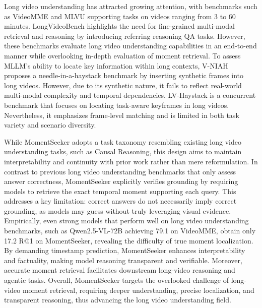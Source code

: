 \documentclass{article}
\begin{document}
Long video understanding has attracted growing attention, with benchmarks such as VideoMME \cite{fu2024videomme} and MLVU \cite{zhou2025mlvu} supporting tasks on videos ranging from 3 to 60 minutes. LongVideoBench \cite{wu2024longvideobench} highlights the need for fine-grained multi-modal retrieval and reasoning by introducing referring reasoning QA tasks. However, these benchmarks evaluate long video understanding capabilities in an end-to-end manner while overlooking in-depth evaluation of moment retrieval. 
To assess MLLM's ability to locate key information within long contexts, V-NIAH~\cite{zhang2024long} proposes a needle-in-a-haystack benchmark by inserting synthetic frames into long videos. However, due to its synthetic nature, it fails to reflect real-world multi-modal complexity and temporal dependencies. LV-Haystack \cite{ye2025lvhaystack} is a concurrent benchmark that focuses on locating task-aware keyframes in long videos. Nevertheless, it emphasizes frame-level matching and is limited in both task variety and scenario diversity.



While MomentSeeker adopts a task taxonomy resembling existing long video understanding tasks, such as Causal Reasoning, this design aims to maintain interpretability and continuity with prior work rather than mere reformulation. In contrast to previous long video understanding benchmarks that only assess answer correctness, MomentSeeker explicitly verifies grounding by requiring models to retrieve the exact temporal moment supporting each query. This addresses a key limitation: correct answers do not necessarily imply correct grounding, as models may guess without truly leveraging visual evidence. Empirically, even strong models that perform well on long video understanding benchmarks, such as Qwen2.5-VL-72B achieving 79.1 on VideoMME, obtain only 17.2 R@1 on MomentSeeker, revealing the difficulty of true moment localization. By demanding timestamp prediction, MomentSeeker enhances interpretability and factuality, making model reasoning transparent and verifiable. Moreover, accurate moment retrieval facilitates downstream long-video reasoning and agentic tasks. Overall, MomentSeeker targets the overlooked challenge of long-video moment retrieval, requiring deeper understanding, precise localization, and transparent reasoning, thus advancing the long video understanding field.
\end{document}
